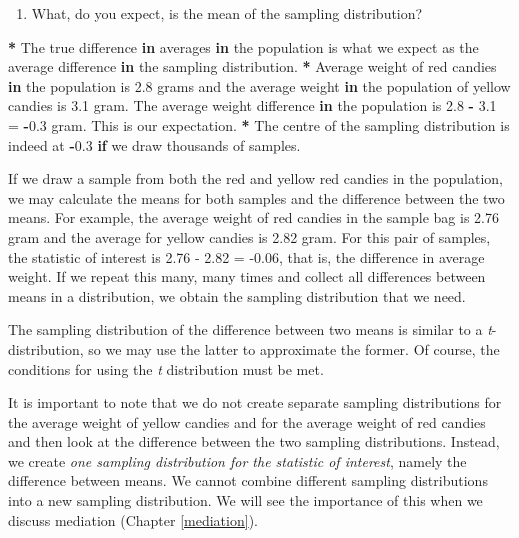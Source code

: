 \documentclass[a4paper]{book}
\newenvironment{Shaded}{\begin{snugshade}}{\end{snugshade}}
\newcommand{\FloatTok}[1]{\textcolor[rgb]{0.00,0.00,0.00}{#1}}
\newcommand{\StringTok}[1]{\textcolor[rgb]{0.00,0.00,0.00}{#1}}
\newcommand{\ControlFlowTok}[1]{\textcolor[rgb]{0.00,0.00,0.00}{\textbf{#1}}}
\newcommand{\OperatorTok}[1]{\textcolor[rgb]{0.00,0.00,0.00}{\textbf{#1}}}
\newcommand{\NormalTok}[1]{#1}
\providecommand{\tightlist}{%
  \setlength{\itemsep}{0pt}\setlength{\parskip}{0pt}}
\theoremstyle{definition}
\theoremstyle{definition}
\theoremstyle{definition}
\theoremstyle{remark}
\begin{document}
\begin{enumerate}
\def\labelenumi{\arabic{enumi}.}
\setcounter{enumi}{3}
\tightlist
\item
  What, do you expect, is the mean of the sampling distribution?
\end{enumerate}

\begin{Shaded}
\begin{Highlighting}[]
\OperatorTok{*}\StringTok{ }\NormalTok{The true difference }\ControlFlowTok{in}\NormalTok{ averages }\ControlFlowTok{in}\NormalTok{ the population is what we expect as the}
\NormalTok{average difference }\ControlFlowTok{in}\NormalTok{ the sampling distribution.}
\OperatorTok{*}\StringTok{ }\NormalTok{Average weight of red candies }\ControlFlowTok{in}\NormalTok{ the population is }\FloatTok{2.8}\NormalTok{ grams and the average}
\NormalTok{weight }\ControlFlowTok{in}\NormalTok{ the population of yellow candies is }\FloatTok{3.1}\NormalTok{ gram. The average weight}
\NormalTok{difference }\ControlFlowTok{in}\NormalTok{ the population is }\FloatTok{2.8} \OperatorTok{-}\StringTok{ }\FloatTok{3.1}\NormalTok{ =}\StringTok{ }\OperatorTok{-}\FloatTok{0.3}\NormalTok{ gram. This is our}
\NormalTok{expectation.}
\OperatorTok{*}\StringTok{ }\NormalTok{The centre of the sampling distribution is indeed at }\OperatorTok{-}\FloatTok{0.3} \ControlFlowTok{if}\NormalTok{ we draw}
\NormalTok{thousands of samples.}
\end{Highlighting}
\end{Shaded}

If we draw a sample from both the red and yellow red candies in the
population, we may calculate the means for both samples and the
difference between the two means. For example, the average weight of red
candies in the sample bag is 2.76 gram and the average for yellow
candies is 2.82 gram. For this pair of samples, the statistic of
interest is 2.76 - 2.82 = -0.06, that is, the difference in average
weight. If we repeat this many, many times and collect all differences
between means in a distribution, we obtain the sampling distribution
that we need.

The sampling distribution of the difference between two means is similar
to a \emph{t}-distribution, so we may use the latter to approximate the
former. Of course, the conditions for using the \emph{t} distribution
must be met.

It is important to note that we do not create separate sampling
distributions for the average weight of yellow candies and for the
average weight of red candies and then look at the difference between
the two sampling distributions. Instead, we create \emph{one sampling
distribution for the statistic of interest}, namely the difference
between means. We cannot combine different sampling distributions into a
new sampling distribution. We will see the importance of this when we
discuss mediation (Chapter \ref{mediation}).
\end{document}

